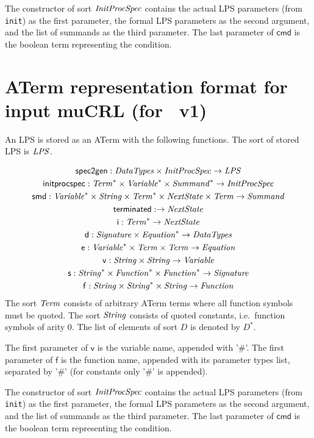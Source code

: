 \documentclass[fleqn,a4paper,dvips]{article}
\newcommand{\aterm}[1]{\mathsf{#1}}
\newcommand{\afunc}[3]{\aterm{#1}:#2\rightarrow#3}
\begin{document}
The constructor of sort $\mathit{InitProcSpec}$ contains the actual LPS
parameters (from \texttt{init}) as the first parameter, the formal LPS
parameters as the second argument, and the list of summands as the
third parameter. The last parameter of $\mathsf{cmd}$ is the boolean term
representing the condition.

\newpage
\section{ATerm representation format for input muCRL (for \mcrl\ v1)}
An LPS is stored as an ATerm with the following functions. The sort
of stored LPS is $\mathit{LPS}$.

\begin{gather*}
\afunc{spec2gen}{\nm{DataTypes}\x\nm{InitProcSpec}}{\nm{LPS}}\\
\afunc{initprocspec}{\nm{Term}^*\x\nm{Variable}^*\x\nm{Summand}^*}{\nm{InitProcSpec}}\\
\afunc{smd}{\nm{Variable}^*\x\nm{String}\x\nm{Term}^*\x\nm{NextState}\x\nm{Term}}{\nm{Summand}}\\
\afunc{terminated}{}{\nm{NextState}}\\
\afunc{i}{\nm{Term}^*}{\nm{NextState}}\\
\afunc{d}{\nm{Signature}\x\nm{Equation}^*}{\nm{DataTypes}}\\
\afunc{e}{\nm{Variable}^*\x\nm{Term}\x\nm{Term}}{\nm{Equation}}\\
\afunc{v}{\nm{String}\x\nm{String}}{\nm{Variable}}\\
\afunc{s}{\nm{String}^*\x\nm{Function}^*\x\nm{Function}^*}{\nm{Signature}}\\
\afunc{f}{\nm{String}\x\nm{String}^{*}\x\nm{String}}{\nm{Function}}
\end{gather*}
The sort $\mathit{Term}$ consists of arbitrary ATerm terms where all function
symbols must be quoted. The sort $\mathit{String}$ consists of quoted constants,
i.e.\ function symbols of arity 0. The list
of elements of sort $D$ is denoted by $D^{*}$.

The first parameter of $\mathsf{v}$ is the variable name, appended with '\#'.
The first parameter of $\mathsf{f}$ is the function name, appended 
with its parameter types list, separated by '\#' (for constants only '\#' is appended).

The constructor of sort $\mathit{InitProcSpec}$ contains the actual LPS
parameters (from \texttt{init}) as the first parameter, the formal LPS
parameters as the second argument, and the list of summands as the
third parameter. The last parameter of $\mathsf{cmd}$ is the boolean term
representing the condition.

%
%
\end{document}
